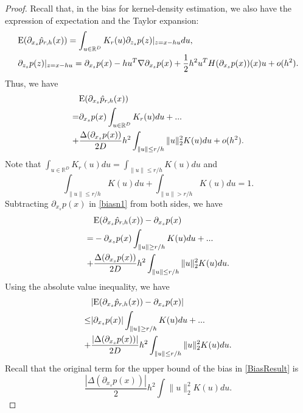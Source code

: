 \documentclass[aos,preprint]{imsart}
\theoremstyle{remark}
\begin{document}
\begin{appendix}
\begin{proof}\label{LKDE bias}
Recall that, in the bias for kernel-density estimation, we also have the expression of expectation and the Taylor expansion:
\[
\begin{aligned}
&{\rm E} (\partial_{x_s} \hat{p}_{r,h}(x)) = \int_ {u\in \mathbb{R}^D} K_r(u) \partial_{z_s}p(z)|_{z=x-hu} d u,\\
&\partial_{z_s} p(z)|_{z=x-hu}
= \partial_{x_s} p(x) -  h u^T\nabla \partial_{x_s} p(x) + \frac{1}{2}h^2 u^T H(\partial_{x_s}p(x))(x)u + o(h^2).
\end{aligned}
\]
Thus, we have
\begin{equation}\label{biasn1}
\begin{aligned}
&{\rm E} (\partial_{x_s} \hat{p}_{r,h}(x))  \\
=& \partial_{x_s} p(x) \int_ {u\in \mathbb{R}^D} K_r(u) du+... \\
+& \frac{\Delta(\partial_{x_s}p(x))}{2D} h^2 \int_{\|u\|\leq r/h } \|u\|_2^2 K(u) du + o(h^2).
\end{aligned}
\end{equation}
Note that $\int_{u\in \mathbb{R}^D} K_r(u) du=\int_{\|u\|\leq r/h} K(u) du$ and 
\[
\int_{\|u\|\leq r/h} K(u) du + \int_{\|u\|> r/h} K(u)du =1.
\]
Subtracting $\partial_{x_s}p(x)$ in \eqref{biasn1} from both sides, we have
\begin{equation}\label{biasn2}
\begin{aligned}
&{\rm E}( \partial_{x_s} \hat{p}_{r,h}(x)) -  \partial_{x_s} p(x) \\
= & -\partial_{x_s} p(x) \int_{\|u\|\geq r/h} K(u) du  +...\\
+& \frac{\Delta(\partial_{x_s} p(x))}{2D} h^2 \int_{\|u\|\leq r/h } \|u\|_2^2 K(u) du .
\end{aligned}
\end{equation}
Using the absolute value inequality, we have
\begin{equation}\label{biasn22}
\begin{aligned}
&|{\rm E}( \partial_{x_s} \hat{p}_{r,h}(x)) -  \partial_{x_s} p(x)| \\
\leq &|\partial_{x_s} p(x)| \int_{\|u\|\geq r/h} K(u) du  + ...\\
+&\frac{|\Delta(\partial_{x_s} p(x))|}{2D} h^2 \int_{\|u\|\leq r/h } \|u\|_2^2 K(u) du.
\end{aligned}
\end{equation}
Recall that the original term for the upper bound of the bias in \eqref{BiasResult} is
\[
\frac{|\Delta(\partial_{x_s}p(x))|}{2} h^2 \int \|u\|_2^2 K(u) du.
\]
\end{proof}
\end{appendix}
\end{document}
